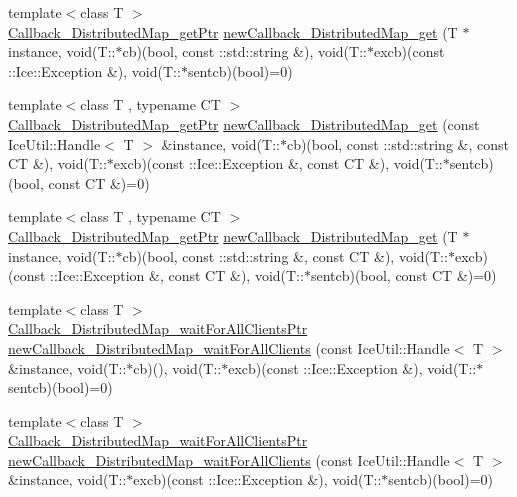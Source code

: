 \begin{DoxyCompactItemize}
\item 
{\footnotesize template$<$class T $>$ }\\\hyperlink{namespace_global_table_a9ad421b8bc43ec4b2173407f2bed7ecc}{Callback\_\-DistributedMap\_\-getPtr} \hyperlink{namespace_global_table_a60e527511f50c2742147c30bd1418631}{newCallback\_\-DistributedMap\_\-get} (T $\ast$instance, void(T::$\ast$cb)(bool, const ::std::string \&), void(T::$\ast$excb)(const ::Ice::Exception \&), void(T::$\ast$sentcb)(bool)=0)
\item 
{\footnotesize template$<$class T , typename CT $>$ }\\\hyperlink{namespace_global_table_a9ad421b8bc43ec4b2173407f2bed7ecc}{Callback\_\-DistributedMap\_\-getPtr} \hyperlink{namespace_global_table_a14348ba5f3f051f97678c758b8af8bf7}{newCallback\_\-DistributedMap\_\-get} (const IceUtil::Handle$<$ T $>$ \&instance, void(T::$\ast$cb)(bool, const ::std::string \&, const CT \&), void(T::$\ast$excb)(const ::Ice::Exception \&, const CT \&), void(T::$\ast$sentcb)(bool, const CT \&)=0)
\item 
{\footnotesize template$<$class T , typename CT $>$ }\\\hyperlink{namespace_global_table_a9ad421b8bc43ec4b2173407f2bed7ecc}{Callback\_\-DistributedMap\_\-getPtr} \hyperlink{namespace_global_table_a51bdc11c35c9aa3aaa7a8fefb6d7f582}{newCallback\_\-DistributedMap\_\-get} (T $\ast$instance, void(T::$\ast$cb)(bool, const ::std::string \&, const CT \&), void(T::$\ast$excb)(const ::Ice::Exception \&, const CT \&), void(T::$\ast$sentcb)(bool, const CT \&)=0)
\item 
{\footnotesize template$<$class T $>$ }\\\hyperlink{namespace_global_table_a110ac4602b8f6c72aa866923747317e3}{Callback\_\-DistributedMap\_\-waitForAllClientsPtr} \hyperlink{namespace_global_table_aa5ce29646d387a4a3eb4591eb1aa1bbf}{newCallback\_\-DistributedMap\_\-waitForAllClients} (const IceUtil::Handle$<$ T $>$ \&instance, void(T::$\ast$cb)(), void(T::$\ast$excb)(const ::Ice::Exception \&), void(T::$\ast$sentcb)(bool)=0)
\item 
{\footnotesize template$<$class T $>$ }\\\hyperlink{namespace_global_table_a110ac4602b8f6c72aa866923747317e3}{Callback\_\-DistributedMap\_\-waitForAllClientsPtr} \hyperlink{namespace_global_table_a7934bc48a6767947eeee537bedd34483}{newCallback\_\-DistributedMap\_\-waitForAllClients} (const IceUtil::Handle$<$ T $>$ \&instance, void(T::$\ast$excb)(const ::Ice::Exception \&), void(T::$\ast$sentcb)(bool)=0)

\end{DoxyCompactItemize}
